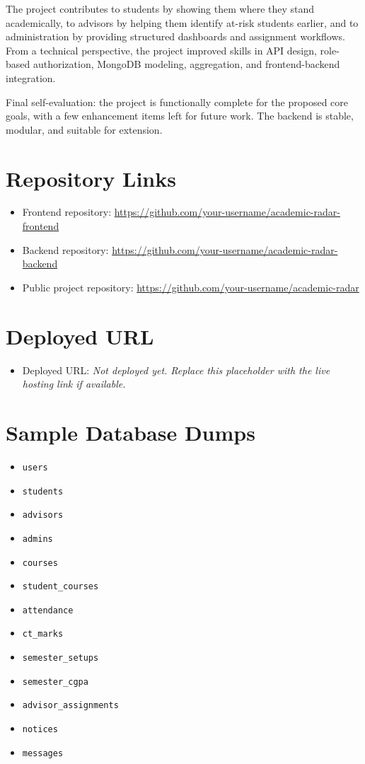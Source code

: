 \documentclass[12pt,a4paper]{article}
\begin{document}
The project contributes to students by showing them where they stand academically, to advisors by helping them identify at-risk students earlier, and to administration by providing structured dashboards and assignment workflows. From a technical perspective, the project improved skills in API design, role-based authorization, MongoDB modeling, aggregation, and frontend-backend integration.

Final self-evaluation: the project is functionally complete for the proposed core goals, with a few enhancement items left for future work. The backend is stable, modular, and suitable for extension.

\appendix
\section{Repository Links}
\begin{itemize}[leftmargin=*]
  \item Frontend repository: \url{https://github.com/your-username/academic-radar-frontend}
  \item Backend repository: \url{https://github.com/your-username/academic-radar-backend}
  \item Public project repository: \url{https://github.com/your-username/academic-radar}
\end{itemize}

\section{Deployed URL}
\begin{itemize}[leftmargin=*]
  \item Deployed URL: \textit{Not deployed yet. Replace this placeholder with the live hosting link if available.}
\end{itemize}

\section{Sample Database Dumps}
\begin{itemize}[leftmargin=*]
  \item \texttt{users}
  \item \texttt{students}
  \item \texttt{advisors}
  \item \texttt{admins}
  \item \texttt{courses}
  \item \texttt{student\_courses}
  \item \texttt{attendance}
  \item \texttt{ct\_marks}
  \item \texttt{semester\_setups}
  \item \texttt{semester\_cgpa}
  \item \texttt{advisor\_assignments}
  \item \texttt{notices}
  \item \texttt{messages}
\end{itemize}
\end{document}
